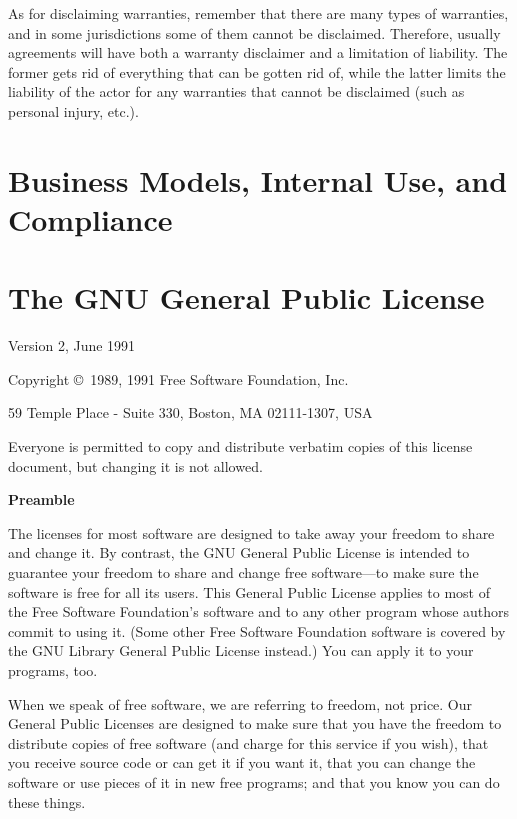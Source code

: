 \documentclass[12pt]{report}
\begin{document}
As for disclaiming warranties, remember that there are many types of
warranties, and in some jurisdictions some of them cannot be disclaimed.
Therefore, usually agreements will have both a warranty disclaimer and a
limitation of liability.  The former gets rid of everything that can be
gotten rid of, while the latter limits the liability of the actor for any
warranties that cannot be disclaimed (such as personal injury, etc.).

\chapter{Business Models, Internal Use, and Compliance}

\appendix

\chapter{The GNU General Public License}

\begin{center}
{\parindent 0in

Version 2, June 1991

Copyright \copyright\ 1989, 1991 Free Software Foundation, Inc.

\bigskip

59 Temple Place - Suite 330, Boston, MA  02111-1307, USA

\bigskip

Everyone is permitted to copy and distribute verbatim copies
of this license document, but changing it is not allowed.
}
\end{center}

\begin{center}
{\bf\large Preamble}
\end{center}


The licenses for most software are designed to take away your freedom to
share and change it.  By contrast, the GNU General Public License is
intended to guarantee your freedom to share and change free software---to
make sure the software is free for all its users.  This General Public
License applies to most of the Free Software Foundation's software and to
any other program whose authors commit to using it.  (Some other Free
Software Foundation software is covered by the GNU Library General Public
License instead.)  You can apply it to your programs, too.

When we speak of free software, we are referring to freedom, not price.
Our General Public Licenses are designed to make sure that you have the
freedom to distribute copies of free software (and charge for this service
if you wish), that you receive source code or can get it if you want it,
that you can change the software or use pieces of it in new free programs;
and that you know you can do these things.
\end{document}
